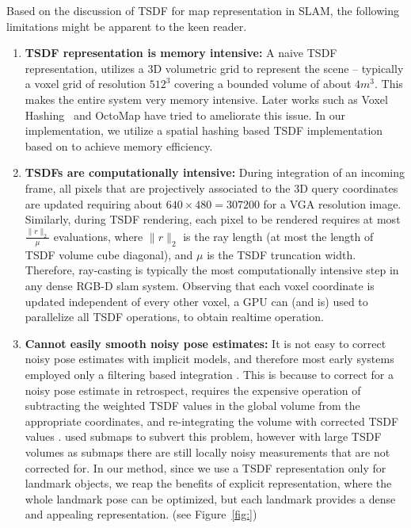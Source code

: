 Based on the discussion of TSDF for map representation in SLAM, the following limitations might be apparent to the keen reader.
\begin{enumerate}
    \item \textbf{TSDF representation is memory intensive:} A naive TSDF representation, utilizes a 3D volumetric grid to represent the scene -- typically  a voxel grid of resolution $512^3$ covering a bounded volume of about $4m^3$. This makes the entire system very memory intensive. Later works such as Voxel Hashing~\cite{niessnerRealtime3DReconstruction2013} and OctoMap \cite{hornungOctoMapEfficientProbabilistic2013} have tried to ameliorate this issue. In our implementation, we utilize a spatial hashing based TSDF implementation based on \cite{dongGPUAcceleratedRobust2019} to achieve memory efficiency.
    \item \textbf{TSDFs are computationally intensive:} During integration of an incoming frame, all pixels that are projectively associated to the 3D query coordinates are updated requiring about $640\times 480 = 307200$ for a VGA resolution image. Similarly, during TSDF rendering, each pixel to be rendered requires at most $\frac{\|r\|_2}{\mu}$ evaluations, where $\|r\|_2$ is the ray length (at most the length of TSDF volume cube diagonal), and $\mu$ is the TSDF truncation width. Therefore, ray-casting is typically the most computationally intensive step in any dense RGB-D slam system. Observing that each voxel coordinate is updated independent of every other voxel, a GPU can (and is) used to parallelize all TSDF operations, to obtain realtime operation.
    \item \textbf{Cannot easily smooth noisy pose estimates:} It is not easy to correct noisy pose estimates with implicit models, and therefore most early systems employed only a filtering based integration \cite{newcombeKinectFusionRealtimeDense2011}. This is because to correct for a noisy pose estimate in retrospect, requires the expensive operation of subtracting the weighted TSDF values in the global volume from the appropriate coordinates, and re-integrating the volume with corrected TSDF values \cite{daiBundleFusionRealtimeGlobally2017}. \cite{whelanKintinuousSpatiallyExtended} used submaps to subvert this problem, however with large TSDF volumes as submaps there are still locally noisy measurements that are not corrected for. In our method, since we use a TSDF representation only for landmark objects, we reap the benefits of explicit representation, where the whole landmark pose can be optimized, but each landmark provides a dense and appealing representation. (see Figure~\ref{fig:})
\end{enumerate}


